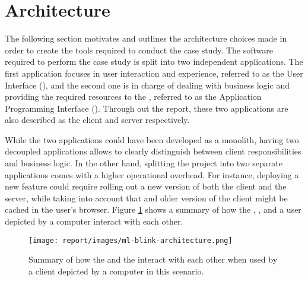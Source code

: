 \section{Architecture} \label{sect:case-study:arch}

The following section motivates and outlines the architecture choices made in order to create the tools required to conduct the case study. The software required to perform the case study is split into two independent applications. The first application focuses in user interaction and experience, referred to as the \mlblink User Interface (\mlblinkui), and the second one is in charge of dealing with business logic and providing the required resources to the \mlblinkui, referred to as the \mlblink Application Programming Interface (\mlblinkapi). Through out the report, these two applications are also described as the client and server respectively.  \newline

While the two applications could have been developed as a monolith, having two decoupled applications allows to clearly distinguish between client responsibilities and business logic. In the other hand, splitting the project into two separate applications comes with a higher operational overhead. For instance, deploying a new feature could require rolling out a new version of both the client and the server, while taking into account that and older version of the client might be cached in the user's browser. Figure \ref{fig:ml-blink-architecture} shows a summary of how the \mlblinkui, \mlblinkapi, and a user depicted by a computer interact with each other.

\begin{figure}[H]
  \centering
  \texttt{[image: report/images/ml-blink-architecture.png]}
  \caption{Summary of how the \mlblinkui and the \mlblinkapi interact with each other when used by a client depicted by a computer in this scenario.}
  \label{fig:ml-blink-architecture}
\end{figure}